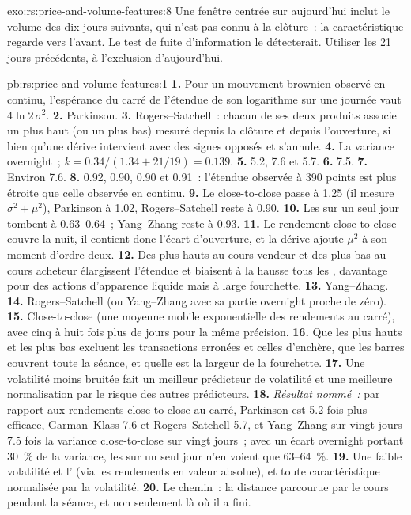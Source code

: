 \begin{solution}{exo:rs:price-and-volume-features:8}
Une fenêtre centrée sur aujourd'hui inclut le volume des dix jours suivants, qui n'est pas connu à la clôture~: la caractéristique regarde vers l'avant. Le test de fuite
d'information le détecterait. Utiliser les 21 jours précédents, à l'exclusion d'aujourd'hui.
\end{solution}

\begin{solution}{pb:rs:price-and-volume-features:1}
\textbf{1.} Pour un mouvement brownien observé en continu, l'espérance du carré de l'étendue de son logarithme sur une journée vaut $4\ln2\,\sigma^2$.
\textbf{2.} Parkinson. \textbf{3.} Rogers--Satchell~: chacun de ses deux produits associe un plus haut (ou un plus bas) mesuré depuis la clôture et depuis
l'ouverture, si bien qu'une dérive intervient avec des signes opposés et s'annule. \textbf{4.} La variance overnight~; $k = 0.34/(1.34 + 21/19) = 0.139$.
\textbf{5.} 5.2, 7.6 et 5.7. \textbf{6.} 7.5. \textbf{7.} Environ 7.6. \textbf{8.} 0.92, 0.90, 0.90 et 0.91~: l'étendue observée à 390
points est plus étroite que celle observée en continu. \textbf{9.} Le close-to-close passe à 1.25 (il mesure $\sigma^2 + \mu^2$), Parkinson à
1.02, Rogers--Satchell reste à 0.90. \textbf{10.} Les  sur un seul jour tombent à 0.63--0.64~; Yang--Zhang reste à 0.93.
\textbf{11.} Le rendement close-to-close couvre la nuit, il contient donc l'écart d'ouverture, et la dérive ajoute $\mu^2$ à son moment d'ordre deux.
\textbf{12.} Des plus hauts au cours vendeur et des plus bas au cours acheteur élargissent l'étendue et biaisent à la hausse tous les , davantage pour des actions d'apparence liquide mais
à large fourchette. \textbf{13.} Yang--Zhang. \textbf{14.} Rogers--Satchell (ou Yang--Zhang avec sa partie overnight proche de zéro).
\textbf{15.} Close-to-close (une moyenne mobile exponentielle des rendements au carré), avec cinq à huit fois plus de jours pour la même précision. \textbf{16.} Que
les plus hauts et les plus bas excluent les transactions erronées et celles d'enchère, que les barres couvrent toute la séance, et quelle est la largeur de la fourchette.
\textbf{17.} Une volatilité moins bruitée fait un meilleur prédicteur de volatilité et une meilleure normalisation par le risque des autres prédicteurs. \textbf{18.}
\emph{Résultat nommé~:} par rapport aux rendements close-to-close au carré, Parkinson est 5.2 fois plus efficace, Garman--Klass 7.6 et
Rogers--Satchell 5.7, et Yang--Zhang sur vingt jours 7.5 fois la variance close-to-close sur vingt jours~; avec un écart overnight portant 30~\%
de la variance, les  sur un seul jour n'en voient que 63--64~\%. \textbf{19.} Une faible volatilité et l' (via les
rendements en valeur absolue), et toute caractéristique normalisée par la volatilité. \textbf{20.} Le chemin~: la distance parcourue par le cours pendant la séance, et non seulement là où il
a fini.
\end{solution}

